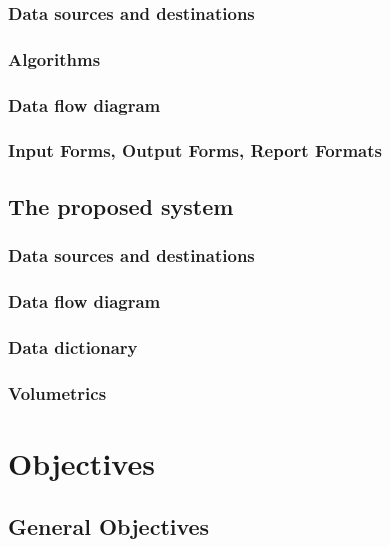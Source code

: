 \subsubsection{Data sources and destinations}

\subsubsection{Algorithms}

\subsubsection{Data flow diagram}

\subsubsection{Input Forms, Output Forms, Report Formats}

\subsection{The proposed system}

\subsubsection{Data sources and destinations}

\subsubsection{Data flow diagram}

\subsubsection{Data dictionary}

\subsubsection{Volumetrics}

\section{Objectives}

\subsection{General Objectives}

